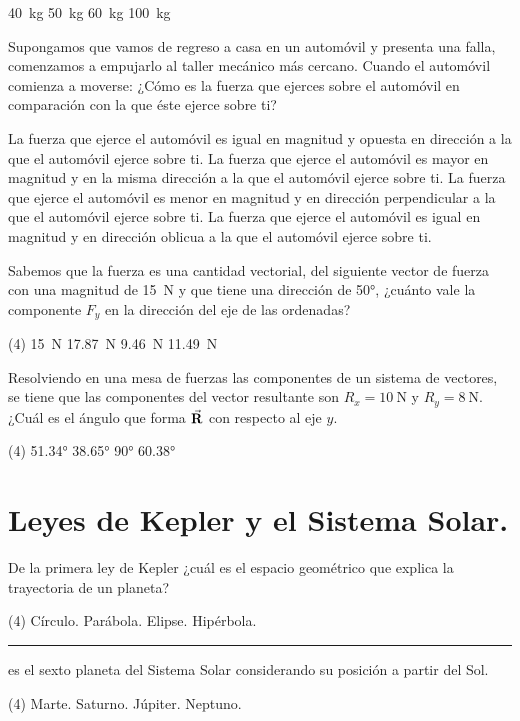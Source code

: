 \documentclass[12pt, letter]{exam}
\begin{document}
\begin{questions}
\begin{tasks}
        \task \SI{40}{\kilo\gram}
        \task \SI{50}{\kilo\gram}
        \task \SI{60}{\kilo\gram}
        \task \SI{100}{\kilo\gram}
    \end{tasks}
    \question Supongamos que vamos de regreso a casa en un automóvil y presenta una falla, comenzamos a empujarlo al taller mecánico más cercano. Cuando el automóvil comienza a moverse: ¿Cómo es la fuerza que ejerces sobre el automóvil en comparación con la que éste ejerce sobre ti? 
    \begin{tasks}
        \task La fuerza que ejerce el automóvil es igual en magnitud y opuesta en dirección a la que el automóvil ejerce sobre ti.
        \task La fuerza que ejerce el automóvil es mayor en magnitud y en la misma dirección a la que el automóvil ejerce sobre ti.
        \task La fuerza que ejerce el automóvil es menor en magnitud y en dirección perpendicular a la que el automóvil ejerce sobre ti.
        \task La fuerza que ejerce el automóvil es igual en magnitud y en dirección oblicua a la que el automóvil ejerce sobre ti.
\end{tasks}
    \question Sabemos que la fuerza es una cantidad vectorial, del siguiente vector de fuerza con una magnitud de \SI{15}{\newton} y que tiene una dirección de \ang{50}, ¿cuánto vale la componente $F_{y}$ en la dirección del eje de las ordenadas?
    \begin{tasks}(4)
        \task \SI{15}{\newton}
        \task \SI{17.87}{\newton}
        \task \SI{9.46}{\newton}
        \task \SI{11.49}{\newton}
    \end{tasks}
    \question Resolviendo en una mesa de fuerzas las componentes de un sistema de vectores, se tiene que las componentes del vector resultante son $R_{x} = \SI{10}{\newton}$ y $R_{y} = \SI{8}{\newton}$. ¿Cuál es el ángulo que forma $\va{R}$ con respecto al eje $y$.
    \begin{tasks}(4)
        \task \ang{51.34}
        \task \ang{38.65}
        \task \ang{90}
        \task \ang{60.38}
    \end{tasks}

    \section{Leyes de Kepler y el Sistema Solar.}
    \question De la primera ley de Kepler ¿cuál es el espacio geométrico que explica la trayectoria de un planeta?
    \begin{tasks}(4)
        \task Círculo.
        \task Parábola.
        \task Elipse.
        \task Hipérbola.
    \end{tasks}
    \question \rule{2cm}{0.1mm} es el sexto planeta del Sistema Solar considerando su posición a partir del Sol.
    \begin{tasks}(4)
        \task Marte.
        \task Saturno.
        \task Júpiter.
        \task Neptuno.
    \end{tasks}
\end{questions}
\end{document}
